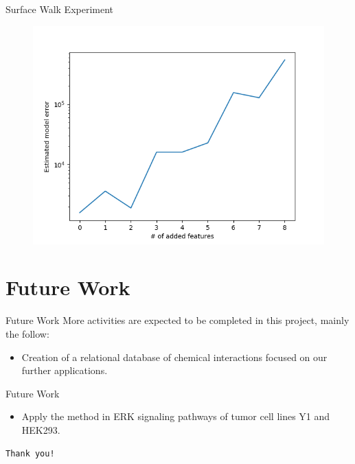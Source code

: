 \documentclass{beamer}
\begin{document}
\begin{frame}{Surface Walk Experiment}
\begin{figure}
    \includegraphics[scale=0.6]{experiments/surface_walk/surface_curve.png}
\end{figure}
\end{frame}

\section{Future Work}

\begin{frame}{Future Work}
More activities are expected to be completed in this project, mainly the
follow:
\begin{itemize}
    \item{} Creation of a relational database of chemical 
        interactions focused on our further applications.
    \end{itemize}
\end{frame}


\begin{frame}{Future Work}
\begin{itemize}
    \item{} Apply the method in ERK signaling 
        pathways of tumor cell lines Y1 and HEK293.
\end{itemize}
\end{frame}

\begin{frame}{}
\begin{center}
    \texttt{Thank you!}
\end{center}
\end{frame}
\end{document}
